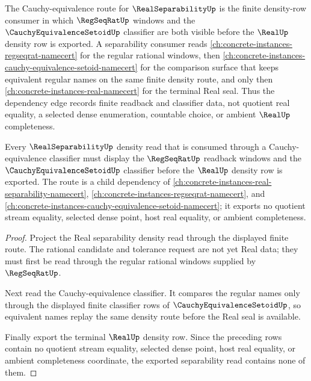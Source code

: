 The Cauchy-equivalence route for $\RealSeparabilityUp$ is the finite density-row consumer in which $\RegSeqRatUp$ windows and the $\CauchyEquivalenceSetoidUp$ classifier are both visible before the $\RealUp$ density row is exported. A separability consumer reads \autoref{ch:concrete-instances-regseqrat-namecert} for the regular rational windows, then \autoref{ch:concrete-instances-cauchy-equivalence-setoid-namecert} for the comparison surface that keeps equivalent regular names on the same finite density route, and only then \autoref{ch:concrete-instances-real-namecert} for the terminal Real seal. Thus the dependency edge records finite readback and classifier data, not quotient real equality, a selected dense enumeration, countable choice, or ambient $\RealUp$ completeness.

\begin{lemma}
\label{lem:real-separability-cauchy-equivalence-dependency-route}
Every $\RealSeparabilityUp$ density read that is consumed through a Cauchy-equivalence classifier must display the $\RegSeqRatUp$ readback windows and the $\CauchyEquivalenceSetoidUp$ classifier before the $\RealUp$ density row is exported. The route is a child dependency of \autoref{ch:concrete-instances-real-separability-namecert}, \autoref{ch:concrete-instances-regseqrat-namecert}, and \autoref{ch:concrete-instances-cauchy-equivalence-setoid-namecert}; it exports no quotient stream equality, selected dense point, host real equality, or ambient completeness.
\end{lemma}
\begin{proof}
Project the Real separability density read through the displayed finite route. The rational candidate and tolerance request are not yet Real data; they must first be read through the regular rational windows supplied by $\RegSeqRatUp$.

Next read the Cauchy-equivalence classifier. It compares the regular names only through the displayed finite classifier rows of $\CauchyEquivalenceSetoidUp$, so equivalent names replay the same density route before the Real seal is available.

Finally export the terminal $\RealUp$ density row. Since the preceding rows contain no quotient stream equality, selected dense point, host real equality, or ambient completeness coordinate, the exported separability read contains none of them.
\end{proof}
